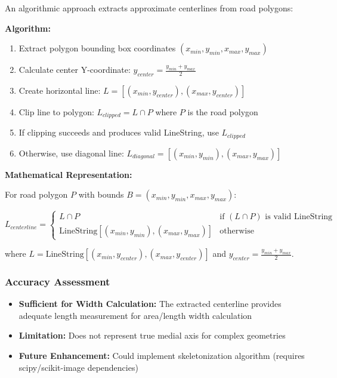 \documentclass[11pt,letterpaper]{article}
\begin{document}
An algorithmic approach extracts approximate centerlines from road polygons:

\textbf{Algorithm:}
\begin{enumerate}
    \item Extract polygon bounding box coordinates $(x_{min}, y_{min}, x_{max}, y_{max})$
    \item Calculate center Y-coordinate: $y_{center} = \frac{y_{min} + y_{max}}{2}$
    \item Create horizontal line: $L = [(x_{min}, y_{center}), (x_{max}, y_{center})]$
    \item Clip line to polygon: $L_{clipped} = L \cap P$ where $P$ is the road polygon
    \item If clipping succeeds and produces valid LineString, use $L_{clipped}$
    \item Otherwise, use diagonal line: $L_{diagonal} = [(x_{min}, y_{min}), (x_{max}, y_{max})]$
\end{enumerate}

\textbf{Mathematical Representation:}

For road polygon $P$ with bounds $B = (x_{min}, y_{min}, x_{max}, y_{max})$:

\begin{equation}
L_{centerline} =
\begin{cases}
L \cap P & \text{if } (L \cap P) \text{ is valid LineString} \\
\text{LineString}[(x_{min}, y_{min}), (x_{max}, y_{max})] & \text{otherwise}
\end{cases}
\end{equation}

where $L = \text{LineString}[(x_{min}, y_{center}), (x_{max}, y_{center})]$ and $y_{center} = \frac{y_{min} + y_{max}}{2}$.

\subsubsection{Accuracy Assessment}

\begin{itemize}
    \item \textbf{Sufficient for Width Calculation:} The extracted centerline provides adequate length measurement for area/length width calculation
    \item \textbf{Limitation:} Does not represent true medial axis for complex geometries
    \item \textbf{Future Enhancement:} Could implement skeletonization algorithm (requires scipy/scikit-image dependencies)
\end{itemize}
\end{document}
